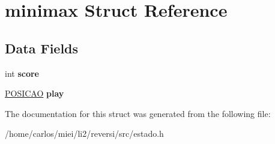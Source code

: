 \hypertarget{structminimax}{}\section{minimax Struct Reference}
\label{structminimax}
\subsection*{Data Fields}
\begin{DoxyCompactItemize}
\item 
\mbox{\label{structminimax_aef160b7437d94056f1dc59646cd5b87d}} 
int {\bfseries score}
\item 
\mbox{\label{structminimax_a85debada400002a4a4463be2d69ce947}} 
\mbox{\hyperlink{structposicao}{P\+O\+S\+I\+C\+AO}} {\bfseries play}
\end{DoxyCompactItemize}


The documentation for this struct was generated from the following file\+:\begin{DoxyCompactItemize}
\item 
/home/carlos/miei/li2/reversi/src/estado.\+h\end{DoxyCompactItemize}
